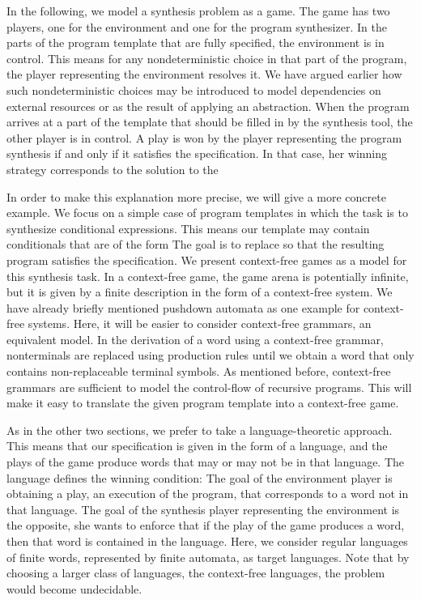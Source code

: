 \documentclass[../../diss.tex]{subfiles}
\begin{document}
In the following, we model a synthesis problem as a game.
The game has two players, one for the environment and one for the program synthesizer.
In the parts of the program template that are fully specified, the environment is in control.
This means for any nondeterministic choice in that part of the program, the player representing the environment resolves it.
We have argued earlier how such nondeterministic choices may be introduced to model dependencies on external resources or as the result of applying an abstraction.
When the program arrives at a part of the template that should be filled in by the synthesis tool, the other player is in control.
A play is won by the player representing the program synthesis if and only if it satisfies the specification.
In that case, her winning strategy corresponds to the solution to the 

In order to make this explanation more precise, we will give a more concrete example.
We focus on a simple case of program templates in which the task is to synthesize conditional expressions.
This means our template may contain conditionals that are of the form 
The goal is to replace  so that the resulting program satisfies the specification.
We present context-free games as a model for this synthesis task.
In a context-free game, the game arena is potentially infinite, but it is given by a finite description in the form of a context-free system.
We have already briefly mentioned pushdown automata as one example for context-free systems.
Here, it will be easier to consider context-free grammars, an equivalent model.
In the derivation of a word using a context-free grammar, nonterminals are replaced using production rules until we obtain a word that only contains non-replaceable terminal symbols.
As mentioned before, context-free grammars are sufficient to model the control-flow of recursive programs.
This will make it easy to translate the given program template into a context-free game.

As in the other two sections, we prefer to take a language-theoretic approach.
This means that our specification is given in the form of a language,
and the plays of the game produce words that may or may not be in that language.
The language defines the winning condition:
The goal of the environment player is obtaining a play, \ie an execution of the program, that corresponds to a word not in that language.
The goal of the synthesis player representing the environment is the opposite, she wants to enforce that if the play of the game produces a word, then that word is contained in the language.
Here, we consider regular languages of finite words, represented by finite automata, as target languages.
Note that by choosing a larger class of languages, \eg the context-free languages, the problem would become undecidable.
\end{document}
